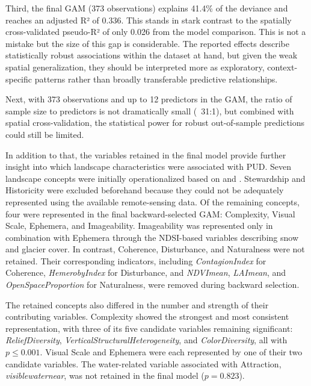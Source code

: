 \documentclass[11pt]{article}
\renewcommand{\_}{\textunderscore\allowbreak{}}
\begin{document}
Third,  the final GAM (373 observations) explains 41.4\% of the deviance and reaches an adjusted R² of 0.336. This stands in stark contrast to the spatially cross-validated pseudo-R² of only 0.026 from the model comparison. This is not a mistake but the size of this gap is considerable. The reported effects describe statistically robust associations within the dataset at hand, but given the weak spatial generalization, they should be interpreted more as exploratory, context-specific patterns rather than broadly transferable predictive relationships. 

Next, with 373 observations and up to 12 predictors in the GAM, the ratio of sample size to predictors is not dramatically small (~31:1), but combined with spatial cross-validation, the statistical power for robust out-of-sample predictions could still be limited. 

In addition to that, the variables retained in the final model provide further insight into which landscape characteristics were associated with PUD. Seven landscape concepts were initially operationalized based on \citet{tveit_key_2006} and \citet{ode_capturing_2008}. Stewardship and Historicity were excluded beforehand because they could not be adequately represented using the available remote-sensing data. Of the remaining concepts, four were represented in the final backward-selected GAM: Complexity, Visual Scale, Ephemera, and Imageability. Imageability was represented only in combination with Ephemera through the NDSI-based variables describing snow and glacier cover. In contrast, Coherence, Disturbance, and Naturalness were not retained. Their corresponding indicators, including \textit{ContagionIndex} for Coherence, \textit{HemerobyIndex} for Disturbance, and \textit{NDVI\_mean}, \textit{LAI\_mean}, and \textit{OpenSpaceProportion} for Naturalness, were removed during backward selection.

The retained concepts also differed in the number and strength of their contributing variables. Complexity showed the strongest and most consistent representation, with three of its five candidate variables remaining significant: \textit{ReliefDiversity}, \textit{VerticalStructuralHeterogeneity}, and \textit{ColorDiversity}, all with $p \leq 0.001$. Visual Scale and Ephemera were each represented by one of their two candidate variables. The water-related variable associated with Attraction, \textit{visible\_water\_near}, was not retained in the final model ($p = 0.823$).
\end{document}
